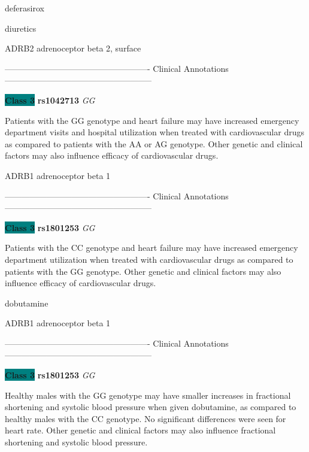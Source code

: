 \documentclass{resume} %
\begin{document}
\begin{rSection}{ deferasirox }
\end{rSection}\begin{rSection}{ diuretics }
\item[]

\begin{rSubsection}{ ADRB2 }{ adrenoceptor beta 2, surface }{}{}
\item[]

\item[] ---------------------------------------------------- Clinical Annotations -----------------------------------------------------\newline
\item \textbf{\colorbox{teal} {Class 3}} \textbf{ rs1042713 } \textit{ GG }
\item[] Patients with the GG genotype and heart failure may have increased emergency department visits and hospital utilization when treated with cardiovascular drugs as compared to patients with the AA or AG genotype. Other genetic and clinical factors may also influence efficacy of cardiovascular drugs.
\end{rSubsection}\begin{rSubsection}{ ADRB1 }{ adrenoceptor beta 1 }{}{}
\item[]

\item[] ---------------------------------------------------- Clinical Annotations -----------------------------------------------------\newline
\item \textbf{\colorbox{teal} {Class 3}} \textbf{ rs1801253 } \textit{ GG }
\item[] Patients with the CC genotype and heart failure may have increased emergency department utilization when treated with cardiovascular drugs as compared to patients with the GG genotype. Other genetic and clinical factors may also influence efficacy of cardiovascular drugs.
\end{rSubsection}

\end{rSection}\begin{rSection}{ dobutamine }
\item[]

\begin{rSubsection}{ ADRB1 }{ adrenoceptor beta 1 }{}{}
\item[]

\item[] ---------------------------------------------------- Clinical Annotations -----------------------------------------------------\newline
\item \textbf{\colorbox{teal} {Class 3}} \textbf{ rs1801253 } \textit{ GG }
\item[] Healthy males with the GG genotype may have smaller increases in fractional shortening and systolic blood pressure when given dobutamine, as compared to healthy males with the CC genotype. No significant differences were seen for heart rate. Other genetic and clinical factors may also influence fractional shortening and systolic blood pressure.
\end{rSubsection}


\end{rSection}
\end{document}

